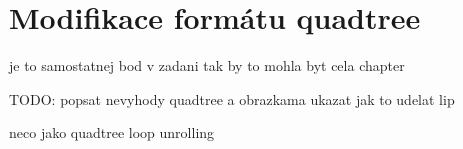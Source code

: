 
\chapter{Modifikace formátu quadtree}

je to samostatnej bod v zadani tak by to mohla byt cela chapter

TODO: popsat nevyhody quadtree a obrazkama ukazat jak to udelat lip

neco jako quadtree loop unrolling
